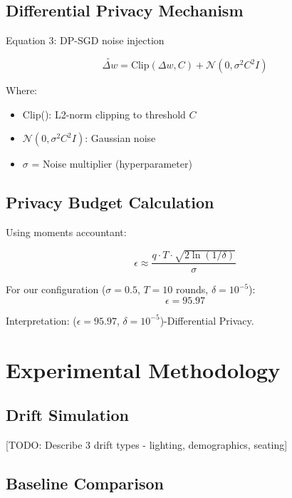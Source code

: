 \documentclass[conference]{IEEEtran}
\begin{document}
\subsection{Differential Privacy Mechanism}

Equation 3: DP-SGD noise injection

\begin{equation}
\tilde{\Delta w} = \text{Clip}(\Delta w, C) + \mathcal{N}(0, \sigma^2 C^2 I)
\end{equation}

Where:
\begin{itemize}
    \item Clip(): L2-norm clipping to threshold $C$
    \item $\mathcal{N}(0, \sigma^2 C^2 I)$: Gaussian noise
    \item $\sigma$ = Noise multiplier (hyperparameter)
\end{itemize}

\subsection{Privacy Budget Calculation}

Using moments accountant:

\begin{equation}
\epsilon \approx \frac{q \cdot T \cdot \sqrt{2 \ln(1/\delta)}}{\sigma}
\end{equation}

For our configuration ($\sigma=0.5$, $T=10$ rounds, $\delta=10^{-5}$):
\[
\epsilon = 95.97
\]

Interpretation: ($\epsilon=95.97$, $\delta=10^{-5}$)-Differential Privacy.

\section{Experimental Methodology}

\subsection{Drift Simulation}

[TODO: Describe 3 drift types - lighting, demographics, seating]

\subsection{Baseline Comparison}
\end{document}
